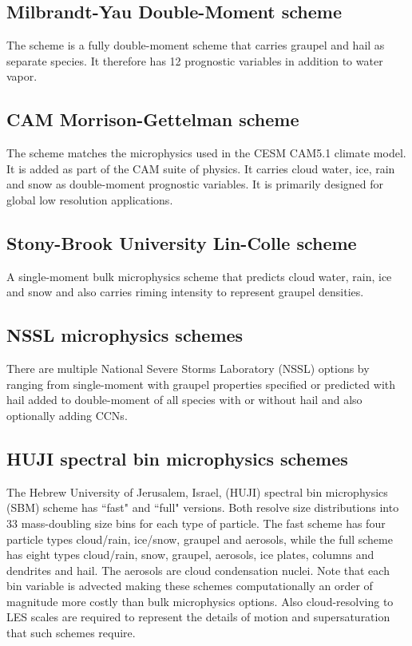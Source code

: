 \subsection {Milbrandt-Yau Double-Moment scheme}
The \citet{milbrandt05} scheme is a fully double-moment scheme that carries graupel and hail as separate species.
It therefore has 12 prognostic variables in addition to water vapor.

\subsection {CAM Morrison-Gettelman scheme}
The \citet{morrisongettelman08} scheme matches the microphysics used in the CESM CAM5.1 climate model. It is added as part of the CAM
suite of physics. It carries cloud water, ice, rain and snow as double-moment prognostic variables. It is primarily designed for global low resolution applications.

\subsection {Stony-Brook University Lin-Colle scheme}
A single-moment bulk microphysics scheme \citep{lin11} that predicts cloud water, rain, ice and snow and also carries riming intensity
to represent graupel densities.

\subsection {NSSL microphysics schemes}
There are multiple National Severe Storms Laboratory (NSSL) options by \citet{mansell10} ranging from single-moment with graupel
properties specified \citep{gilmore04} or predicted with hail added to double-moment of all species with or without hail and also optionally adding CCNs.

\subsection {HUJI spectral bin microphysics schemes}
The Hebrew University of Jerusalem, Israel, (HUJI) spectral bin microphysics (SBM) scheme has ``fast" and  ``full" versions.
Both resolve size distributions into 33 mass-doubling size bins for each type of particle. The fast scheme \citep{khain10} has four
particle types cloud/rain, ice/snow, graupel and aerosols, while the full scheme \citep{khain04} has eight types cloud/rain, snow, graupel, aerosols,
ice plates, columns and dendrites and hail. The aerosols are cloud condensation nuclei. Note that each bin variable is advected
making these schemes computationally an order of magnitude more costly than bulk microphysics options. Also cloud-resolving to LES
scales are required to represent the details of motion and supersaturation that such schemes require.

